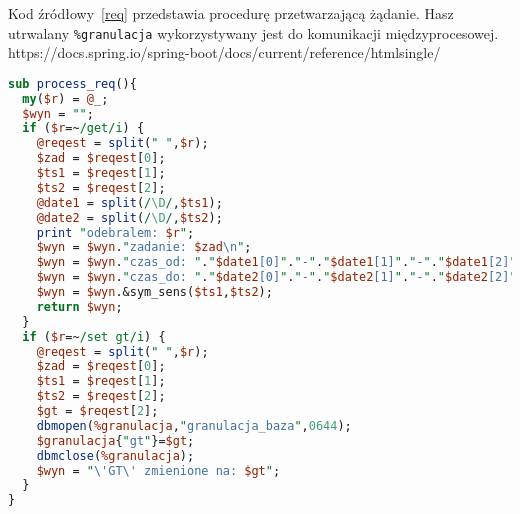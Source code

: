 {\color{dgray}
Kod źródłowy~\ref{req} przedstawia procedurę przetwarzającą żądanie. Hasz utrwalany \verb|%granulacja| wykorzystywany jest do komunikacji międzyprocesowej.
}https://docs.spring.io/spring-boot/docs/current/reference/htmlsingle/

\begin{small}
\begin{lstlisting}[language=perl, frame=lines, caption=Przetwarzanie żądania - procedura \texttt{process\_req()}\label{req}., firstnumber=86]
sub process_req(){	
  my($r) = @_;
  $wyn = "";
  if ($r=~/get/i) {
	@reqest = split(" ",$r);
	$zad = $reqest[0];
	$ts1 = $reqest[1];
	$ts2 = $reqest[2];
	@date1 = split(/\D/,$ts1);
	@date2 = split(/\D/,$ts2);
	print "odebralem: $r"; 
	$wyn = $wyn."zadanie: $zad\n";
	$wyn = $wyn."czas_od: "."$date1[0]"."-"."$date1[1]"."-"."$date1[2]"."_"."$date1[3]".":"."$date1[4]".":"."$date1[5]"."\n";
	$wyn = $wyn."czas_do: "."$date2[0]"."-"."$date2[1]"."-"."$date2[2]"."_"."$date2[3]".":"."$date2[4]".":"."$date2[5]"."\n";		
	$wyn = $wyn.&sym_sens($ts1,$ts2);
	return $wyn;
  }
  if ($r=~/set gt/i) {
	@reqest = split(" ",$r);
	$zad = $reqest[0];
	$ts1 = $reqest[1];
	$ts2 = $reqest[2];
	$gt = $reqest[2];
	dbmopen(%granulacja,"granulacja_baza",0644);
	$granulacja{"gt"}=$gt;
	dbmclose(%granulacja);
	$wyn = "\'GT\' zmienione na: $gt";
  }		
}	
\end{lstlisting} 
\end{small}
